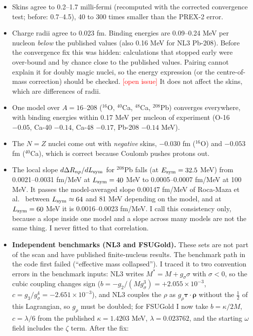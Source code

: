 \documentclass[11pt,a4paper]{article}
\newcommand{\fillin}[1]{\textcolor{red}{[#1]}}
\newcommand{\Esym}{E_{\rm sym}}
\newcommand{\Lsym}{L_{\rm sym}}
\newcommand{\DRnp}{\Delta R_{np}}
\begin{document}
\begin{itemize}
\item Skins agree to 0.2--1.7 milli-fermi (recomputed with the corrected convergence test; before: 0.7--4.5), 40 to 300 times smaller than the PREX-2 error.
\item Charge radii agree to 0.023 fm. Binding energies are 0.09--0.24 MeV per nucleon \emph{below} the published values (also 0.16 MeV for NL3 Pb-208). Before the convergence fix this was hidden: calculations that stopped early were over-bound and by chance close to the published values. Pairing cannot explain it for doubly magic nuclei, so the energy expression (or the centre-of-mass correction) should be checked. \fillin{open issue} It does not affect the skins, which are differences of radii.
\item One model over $A=16$--208 ($^{16}$O, $^{40}$Ca, $^{48}$Ca, $^{208}$Pb) converges everywhere, with binding energies within 0.17 MeV per nucleon of experiment (O-16 $-0.05$, Ca-40 $-0.14$, Ca-48 $-0.17$, Pb-208 $-0.14$ MeV).
\item The $N=Z$ nuclei come out with \emph{negative} skins, $-0.030$ fm ($^{16}$O) and $-0.053$ fm ($^{40}$Ca), which is correct because Coulomb pushes protons out.
\item The local slope $d\DRnp/d\Lsym$ for $^{208}$Pb falls (at $\Esym=32.5$ MeV) from 0.0021--0.0031 fm/MeV at $\Lsym=40$ MeV to 0.0005--0.0007 fm/MeV at 100 MeV. It passes the model-averaged slope 0.00147 fm/MeV of Roca-Maza et al.\ \cite{RocaMaza2011} between $\Lsym\approx64$ and 81 MeV depending on the model, and at $\Lsym=60$ MeV it is 0.0016--0.0023 fm/MeV. I call this consistency only, because a slope inside one model and a slope across many models are not the same thing. I never fitted to that correlation.
\item \textbf{Independent benchmarks (NL3 and FSUGold).} These sets are not part of the scan and have published finite-nucleus results. The benchmark path in the code first failed (``effective mass collapsed''). I traced it to two convention errors in the benchmark inputs: NL3 writes $M^*=M+g_\sigma\sigma$ with $\sigma<0$, so the cubic coupling changes sign ($b=-g_2/(Mg_\sigma^3)=+2.055\times10^{-3}$, $c=g_3/g_\sigma^4=-2.651\times10^{-3}$), and NL3 couples the $\rho$ as $g_\rho\boldsymbol\tau\cdot\boldsymbol\rho$ without the $\tfrac12$ of this Lagrangian, so $g_\rho$ must be doubled; for FSUGold I now take $b=\kappa/2M$, $c=\lambda/6$ from the published $\kappa=1.4203$ MeV, $\lambda=0.023762$, and the starting $\omega$ field includes the $\zeta$ term. After the fix:

\end{itemize}
\end{document}
